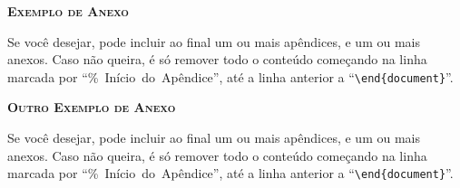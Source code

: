 \documentclass[a4paper, 12pt]{ppgeb}
\begin{document}
\noindent\begin{large}{\bfseries\scshape Exemplo de Anexo}\end{large} \label{sec:anexo1}

\vspace{24pt}

Se você desejar, pode incluir ao final um ou mais apêndices, e um ou mais anexos. Caso não queira, é só remover todo o conteúdo começando na linha marcada por ``\%~Início~do~Apêndice'', até a linha anterior a ``\verb|\end{document}|''.

\clearpage
\begin{flushright}
\end{flushright}

\noindent\begin{large}{\bfseries\scshape Outro Exemplo de Anexo}\end{large} \label{sec:anexo2}

\vspace{24pt}

Se você desejar, pode incluir ao final um ou mais apêndices, e um ou mais anexos. Caso não queira, é só remover todo o conteúdo começando na linha marcada por ``\%~Início~do~Apêndice'', até a linha anterior a ``\verb|\end{document}|''.
\end{document}
